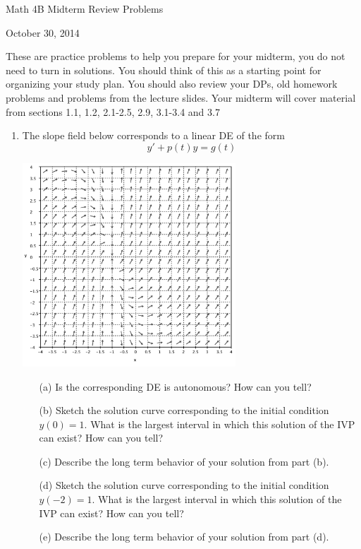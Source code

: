 \documentclass[12pt]{article}
\newcommand{\noi}{\noindent}
\begin{document}
\begin{center}
Math 4B Midterm Review Problems

October 30, 2014
  
\end{center}

\noindent These are practice problems to help you prepare for your midterm, you do not need to turn in solutions.  You should think of this as a starting point for organizing your study plan.   You should also review your DPs, old homework problems and problems from the lecture slides.
\vskip 2mm
\noi Your midterm will cover material from sections 1.1, 1.2, 2.1-2.5, 2.9, 3.1-3.4 and 3.7  
\begin{enumerate}


\item The slope field below corresponds to a linear DE of the form
$$y' + p(t)y = g(t)$$
\begin{center}
\includegraphics[width=80mm]{slope.png}
\end{center}
\begin{itemize}
\item[(a)] Is the corresponding DE is autonomous?  How can you tell?
\item[(b)] Sketch the solution curve corresponding to the initial condition $y(0) = 1$.  What is the largest interval in which this solution of the IVP can exist?  How can you tell? 
\item[(c)] Describe the long term behavior of your solution from part (b).
\item[(d)] Sketch the solution curve corresponding to the initial condition $y(-2) = 1$. What is the largest interval in which this solution of the IVP can exist?  How can you tell? 
\item[(e)] Describe the long term behavior of your solution from part (d).


\end{itemize}
\end{enumerate}
\end{document}
